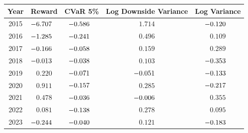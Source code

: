 \begingroup
\renewcommand{\arraystretch}{0.95}
\setlength{\tabcolsep}{6pt}
\begin{tabular}{@{}ccccc@{}}
\toprule
Year & Reward & CVaR 5\% & Log Downside Variance & Log Variance \\
\midrule
2015 & $\mathllap{-}6.707$\sym{***} & $\mathllap{-}0.586$\sym{***} & $1.714$\sym{***} & $\mathllap{-}0.120$ \\
2016 & $\mathllap{-}1.285$\sym{***} & $\mathllap{-}0.241$\sym{*} & $0.496$\sym{**} & $0.109$ \\
2017 & $\mathllap{-}0.166$ & $\mathllap{-}0.058$ & $0.159$ & $0.289$\sym{**} \\
2018 & $\mathllap{-}0.013$ & $\mathllap{-}0.038$ & $0.103$ & $\mathllap{-}0.353$\sym{***} \\
2019 & $0.220$ & $\mathllap{-}0.071$ & $\mathllap{-}0.051$ & $\mathllap{-}0.133$ \\
2020 & $0.911$ & $\mathllap{-}0.157$ & $0.285$\sym{*} & $\mathllap{-}0.217$ \\
2021 & $0.478$ & $\mathllap{-}0.036$ & $\mathllap{-}0.006$ & $0.355$\sym{***} \\
2022 & $0.081$ & $\mathllap{-}0.138$\sym{***} & $0.278$\sym{***} & $0.095$\sym{*} \\
2023 & $\mathllap{-}0.244$ & $\mathllap{-}0.040$ & $0.121$\sym{***} & $\mathllap{-}0.183$\sym{**} \\
\bottomrule
\end{tabular}
\endgroup
